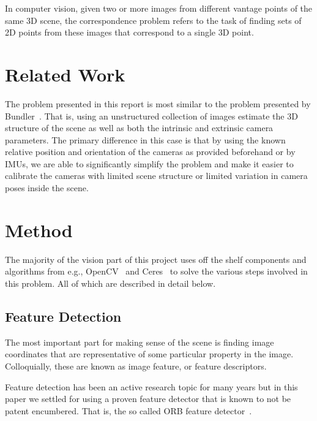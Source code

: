 \documentclass[preprint,acmtog]{acmart}
\begin{document}
In computer vision, given two or more images from different vantage points of
the same 3D scene, the correspondence problem refers to the task of finding sets
of 2D points from these images that correspond to a single 3D point.


\section{Related Work}


The problem presented in this report is most similar to the problem presented by
Bundler~\cite{bundler2006}. That is, using an unstructured collection of images
estimate the 3D structure of the scene as well as both the intrinsic and
extrinsic camera parameters. The primary difference in this case is that by
using the known relative position and orientation of the cameras as provided
beforehand or by IMUs, we are able to significantly simplify the problem and
make it easier to calibrate the cameras with limited scene structure or limited
variation in camera poses inside the scene.


\section{Method}

The majority of the vision part of this project uses off the shelf components
and algorithms from e.g., OpenCV~\cite{opencv_library} and
Ceres~\cite{ceres-solver} to solve the various steps involved in this
problem. All of which are described in detail below.

\subsection{Feature Detection}

The most important part for making sense of the scene is finding image
coordinates that are representative of some particular property in the
image. Colloquially, these are known as image feature, or feature descriptors.

Feature detection has been an active research topic for many years but in this
paper we settled for using a proven feature detector that is known to not be
patent encumbered. That is, the so called ORB feature detector~\cite{orb2011}.
\end{document}
